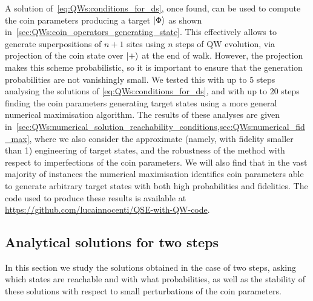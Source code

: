 A solution of~\cref{eq:QWs:conditions_for_ds}, once found, can be used to compute the coin parameters producing a target $\ket\Phi$ as shown in~\cref{sec:QWs:coin_operators_generating_state}.
This effectively allows to generate superpositions of $n+1$ sites using $n$ steps of \ac{QW} evolution, via projection of the coin state over $\ket+$ at the end of walk.
However, the projection makes this scheme probabilistic, so it is important to ensure that the generation probabilities are not vanishingly small.
We tested this with up to $5$ steps analysing the solutions of \cref{eq:QWs:conditions_for_ds}, and with up to $20$ steps finding the coin parameters generating target states using a more general numerical maximisation algorithm.
The results of these analyses are given in~\cref{sec:QWs:numerical_solution_reachability_conditions,sec:QWs:numerical_fid_max},
where we also consider the approximate (namely, with fidelity smaller than 1) engineering of target states,
and the robustness of the method with respect to imperfections of the coin parameters.
We will also find that in the vast majority of instances the numerical maximisation identifies coin parameters able to generate arbitrary target states with both high probabilities and fidelities.
The code used to produce these results is available at \href{github.com/lucainnocenti/QSE-with-QW-code}{https://github.com/lucainnocenti/QSE-with-QW-code}.

\subsection{Analytical solutions for two steps}
\label{sec:QWs:analytical_sol_2steps}

In this section we study the solutions obtained in the case of two steps, asking which states are reachable and with what probabilities, as well as the stability of these solutions with respect to small perturbations of the coin parameters.

